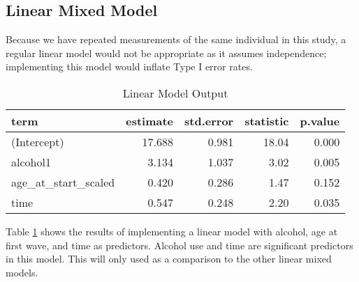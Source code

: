 \documentclass[12pt, twoside]{amherstthesis}
\begin{document}
\hypertarget{linear-mixed-model}{%
\subsection{Linear Mixed Model}\label{linear-mixed-model}}

Because we have repeated measurements of the same individual in this study, a regular linear model would not be appropriate as it assumes independence; implementing this model would inflate Type I error rates.
\begin{table}[H]

\caption{\label{tab:lm}Linear Model Output}
\centering
\begin{tabular}[t]{lrrrr}
\toprule
term & estimate & std.error & statistic & p.value\\
\midrule
(Intercept) & 17.688 & 0.981 & 18.04 & 0.000\\
alcohol1 & 3.134 & 1.037 & 3.02 & 0.005\\
age\_at\_start\_scaled & 0.420 & 0.286 & 1.47 & 0.152\\
time & 0.547 & 0.248 & 2.20 & 0.035\\
\bottomrule
\end{tabular}
\end{table}
Table \ref{tab:lm} shows the results of implementing a linear model with alcohol, age at first wave, and time as predictors. Alcohol use and time are significant predictors in this model. This will only used as a comparison to the other linear mixed models.
\end{document}
